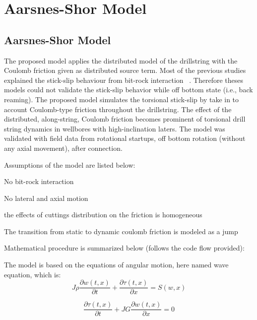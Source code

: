 \chapter{Aarsnes-Shor Model}

\section{Aarsnes-Shor Model}

The proposed model applies the distributed model of the drillstring with the Coulomb friction given as distributed source term. Most of the previous studies explained the stick-slip behaviour from bit-rock interaction ~\cite{ref:germay2009a, ref:richard2007a, ref:zhang2020a}. Therefore theses models could not validate the stick-slip behavior while off bottom state (i.e., back reaming). The proposed model simulates the torsional stick-slip by take in to account Coulomb-type friction throughout the drillstring. The effect of the distributed, along-string, Coulomb friction becomes prominent of torsional drill string dynamics in wellbores with high-inclination laters. The model was validated with field data from rotational startups, off bottom rotation (without any axial movement), after connection.

Assumptions of the model are listed below:
\begin{bulletedlist}
    \item No bit-rock interaction
    \item No lateral and axial motion
    \item the effects of cuttings distribution on the friction is homogeneous
    \item The transition from static to dynamic coulomb friction is modeled as a jump
\end{bulletedlist}


\noindent Mathematical procedure is summarized below (follows the code flow provided):

The model is based on the equations of angular motion, here named wave equation, which is:
\begin{equation}\label{AS-motion}
  J\rho\frac{\partial w(t,x)}{\partial t} + \frac{\partial \tau (t,x)}{\partial x} = S(w,x) 
\end{equation}

\begin{equation}
 \frac{\partial\tau(t,x)}{\partial t} + JG\frac{\partial w(t,x)}{\partial x} = 0 
\end{equation}

